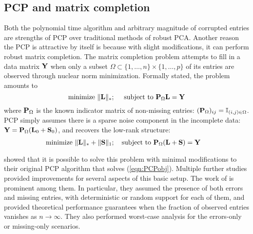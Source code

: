 \subsection{PCP and matrix completion}
Both the polynomial time algorithm and arbitrary magnitude of corrupted entries are strengths of PCP over traditional methods of robust PCA. Another reason the PCP is attractive by itself is because with slight modifications, it can perform robust matrix completion. The matrix completion problem attempts to fill in a data matrix ${\mathbf{Y}}$ when only a subset $\Omega \subset \{ 1, \ldots, n\} \times \{ 1, \ldots, p\}$ of its entries are observed through nuclear norm minimization. Formally stated, the problem amounts to
%
$$
\text{minimize } \| {\mathbf{L}} \|_*; \quad \text{ subject to } {\mathbf{P}}_\Omega {\mathbf{L}} = {\mathbf{Y}}
$$
%
where ${\mathbf{P}}_\Omega$ is the known indicator matrix of non-missing entries: $({\mathbf{P}}_\Omega)_{ij} = {\mathbb{I}}_{(i,j) \in \Omega}$. PCP simply assumes there is a sparse noise component in the incomplete data: ${\mathbf{Y}} = {\mathbf{P}}_\Omega ({\mathbf{L}}_0 + {\mathbf{S}}_0)$, and recovers the low-rank structure:
%
\begin{align}\label{eqn:PCPMCobj}
& \text{minimize } \| {\mathbf{L}} \|_* + \| {\mathbf{S}} \|_1; \quad \text{subject to } {\mathbf{P}}_\Omega({\mathbf{L}} + {\mathbf{S}}) = {\mathbf{Y}}
\end{align}
%

\cite{CandesEtal09} showed that it is possible to solve this problem with minimal modifications to their original PCP algorithm that solves (\ref{eqn:PCPobj}). Multiple further studies provided improvements for several aspects of this basic setup. The work of \cite{ChenEtal11} is prominent among them. In particular, they assumed the presence of both errors and missing entries, with deterministic or random support for each of them, and provided theoretical performance guarantees when the fraction of observed entries vanishes as $n \rightarrow \infty$. They also performed worst-case analysis  for the errors-only or missing-only scenarios.


